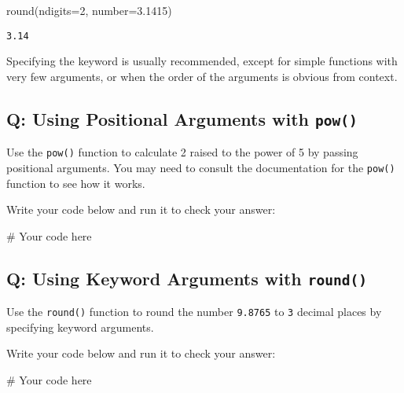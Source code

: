 \documentclass[
  letterpaper,
  DIV=11,
  numbers=noendperiod]{scrreprt}
\newenvironment{Shaded}{\begin{snugshade}}{\end{snugshade}}
\newcommand{\BuiltInTok}[1]{\textcolor[rgb]{0.00,0.23,0.31}{#1}}
\newcommand{\CommentTok}[1]{\textcolor[rgb]{0.37,0.37,0.37}{#1}}
\newcommand{\DecValTok}[1]{\textcolor[rgb]{0.68,0.00,0.00}{#1}}
\newcommand{\FloatTok}[1]{\textcolor[rgb]{0.68,0.00,0.00}{#1}}
\newcommand{\NormalTok}[1]{\textcolor[rgb]{0.00,0.23,0.31}{#1}}
\newcommand{\OperatorTok}[1]{\textcolor[rgb]{0.37,0.37,0.37}{#1}}
\begin{document}
\begin{Shaded}
\begin{Highlighting}[]
\BuiltInTok{round}\NormalTok{(ndigits}\OperatorTok{=}\DecValTok{2}\NormalTok{, number}\OperatorTok{=}\FloatTok{3.1415}\NormalTok{)}
\end{Highlighting}
\end{Shaded}

\begin{verbatim}
3.14
\end{verbatim}

Specifying the keyword is usually recommended, except for simple
functions with very few arguments, or when the order of the arguments is
obvious from context.

\begin{tcolorbox}[enhanced jigsaw, colframe=quarto-callout-tip-color-frame, opacityback=0, titlerule=0mm, bottomrule=.15mm, breakable, leftrule=.75mm, colbacktitle=quarto-callout-tip-color!10!white, title=\textcolor{quarto-callout-tip-color}{\faLightbulb}\hspace{0.5em}{Practice}, rightrule=.15mm, coltitle=black, opacitybacktitle=0.6, colback=white, left=2mm, arc=.35mm, toptitle=1mm, bottomtitle=1mm, toprule=.15mm]

\subsection{\texorpdfstring{Q: Using Positional Arguments with
\texttt{pow()}}{Q: Using Positional Arguments with pow()}}\label{q-using-positional-arguments-with-pow}

Use the \texttt{pow()} function to calculate 2 raised to the power of 5
by passing positional arguments. You may need to consult the
documentation for the \texttt{pow()} function to see how it works.

Write your code below and run it to check your answer:

\begin{Shaded}
\begin{Highlighting}[]
\CommentTok{\# Your code here}
\end{Highlighting}
\end{Shaded}

\subsection{\texorpdfstring{Q: Using Keyword Arguments with
\texttt{round()}}{Q: Using Keyword Arguments with round()}}\label{q-using-keyword-arguments-with-round}

Use the \texttt{round()} function to round the number \texttt{9.8765} to
\texttt{3} decimal places by specifying keyword arguments.

Write your code below and run it to check your answer:

\begin{Shaded}
\begin{Highlighting}[]
\CommentTok{\# Your code here}
\end{Highlighting}
\end{Shaded}

\end{tcolorbox}
\end{document}
